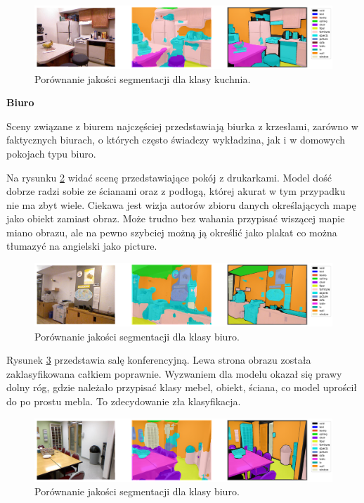 \begin{figure}[ht!]
    \centering
    \includegraphics[width=\textwidth]{img/preds_analysis/gt_vs_pred/kitchen-3.png}
    \caption{Porównanie jakości segmentacji dla klasy kuchnia.}
    \label{fig:kitchen-pred-3}
\end{figure}

\noindent
\textbf{Biuro}

Sceny związane z biurem najczęściej przedstawiają biurka z krzesłami, zarówno w faktycznych biurach, o których często świadczy wykładzina, jak i w domowych pokojach typu biuro.

Na rysunku \ref{fig:office-pred-1} widać scenę przedstawiające pokój z drukarkami. Model dość dobrze radzi sobie ze ścianami oraz z podłogą, której akurat w tym przypadku nie ma zbyt wiele. Ciekawa jest wizja autorów zbioru danych określających mapę jako obiekt zamiast obraz. Może trudno bez wahania przypisać wiszącej mapie miano obrazu, ale na pewno szybciej możną ją określić jako plakat co można tłumazyć na angielski jako picture.

\begin{figure}[ht!]
    \centering
    \includegraphics[width=\textwidth]{img/preds_analysis/gt_vs_pred/office-1.png}
    \caption{Porównanie jakości segmentacji dla klasy biuro.}
    \label{fig:office-pred-1}
\end{figure}

Rysunek \ref{fig:office-pred-2} przedstawia salę konferencyjną. Lewa strona obrazu została zaklasyfikowana całkiem poprawnie. Wyzwaniem dla modelu okazał się prawy dolny róg, gdzie należało przypisać klasy mebel, obiekt, ściana, co model uprościł do po prostu mebla. To zdecydowanie zła klasyfikacja.

\begin{figure}[ht!]
    \centering
    \includegraphics[width=\textwidth]{img/preds_analysis/gt_vs_pred/office-2.png}
    \caption{Porównanie jakości segmentacji dla klasy biuro.}
    \label{fig:office-pred-2}
\end{figure}

